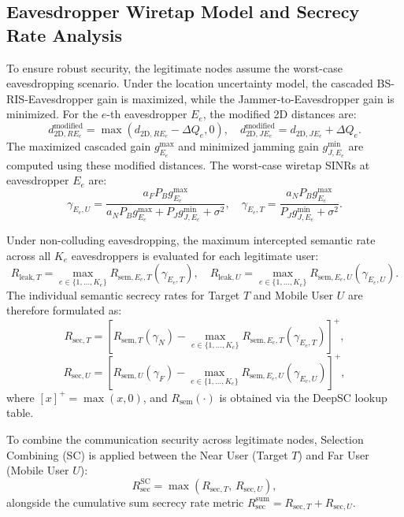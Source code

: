 \documentclass[journal,onecolumn]{IEEEtran}
\begin{document}
\subsection{Eavesdropper Wiretap Model and Secrecy Rate Analysis}
To ensure robust security, the legitimate nodes assume the worst-case eavesdropping scenario. Under the location uncertainty model, the cascaded BS-RIS-Eavesdropper gain is maximized, while the Jammer-to-Eavesdropper gain is minimized. For the $e$-th eavesdropper $E_e$, the modified 2D distances are:
\begin{equation}
    d_{\text{2D}, RE_e}^{\text{modified}} = \max(d_{\text{2D}, RE_e} - \Delta Q_e, 0), \quad
    d_{\text{2D}, JE_e}^{\text{modified}} = d_{\text{2D}, JE_e} + \Delta Q_e.
\end{equation}
The maximized cascaded gain $g_{E_e}^{\max}$ and minimized jamming gain $g_{J, E_e}^{\min}$ are computed using these modified distances. The worst-case wiretap SINRs at eavesdropper $E_e$ are:
\begin{equation}
    \gamma_{E_e, U} = \frac{a_F P_B g_{E_e}^{\max}}{a_N P_B g_{E_e}^{\max} + P_J g_{J, E_e}^{\min} + \sigma^2}, \quad
    \gamma_{E_e, T} = \frac{a_N P_B g_{E_e}^{\max}}{P_J g_{J, E_e}^{\min} + \sigma^2}.
\end{equation}

Under non-colluding eavesdropping, the maximum intercepted semantic rate across all $K_e$ eavesdroppers is evaluated for each legitimate user:
\begin{equation}
    R_{\text{leak}, T} = \max_{e \in \{1, \dots, K_e\}} R_{\text{sem}, E_e, T}(\gamma_{E_e, T}), \quad
    R_{\text{leak}, U} = \max_{e \in \{1, \dots, K_e\}} R_{\text{sem}, E_e, U}(\gamma_{E_e, U}).
\end{equation}
The individual semantic secrecy rates for Target $T$ and Mobile User $U$ are therefore formulated as:
\begin{equation}
    R_{\text{sec}, T} = \left[ R_{\text{sem}, T}(\gamma_N) - \max_{e \in \{1, \dots, K_e\}} R_{\text{sem}, E_e, T}(\gamma_{E_e, T}) \right]^+,
\end{equation}
\begin{equation}
    R_{\text{sec}, U} = \left[ R_{\text{sem}, U}(\gamma_F) - \max_{e \in \{1, \dots, K_e\}} R_{\text{sem}, E_e, U}(\gamma_{E_e, U}) \right]^+,
\end{equation}
where $[x]^+ = \max(x, 0)$, and $R_{\text{sem}}(\cdot)$ is obtained via the DeepSC lookup table.

To combine the communication security across legitimate nodes, Selection Combining (SC) is applied between the Near User (Target $T$) and Far User (Mobile User $U$):
\begin{equation}
    R_{\text{sec}}^{\text{SC}} = \max\left( R_{\text{sec}, T},\, R_{\text{sec}, U} \right),
\end{equation}
alongside the cumulative sum secrecy rate metric $R_{\text{sec}}^{\text{sum}} = R_{\text{sec}, T} + R_{\text{sec}, U}$.
\end{document}
